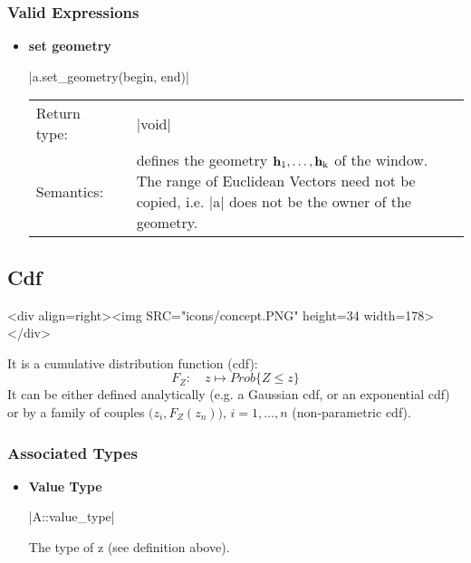 \documentclass[12pt,twoside]{report}
\newcommand{\mloc}[1]{\rm{\bf #1}}
\begin{document}
 
\htmlrule[CLEAR=all]  \subsubsection*{Valid Expressions}
\begin{itemize}

\item {\bf set geometry}

  |a.set_geometry(begin, end)|

  \begin{tabular}[!h]{l p{1cm} p{10cm}}
    Return type: & & |void|\\
    Semantics: & & defines the geometry $\mloc{h}_1,\ldots, \mloc{h}_k$ of the window. The range of Euclidean Vectors need not be copied, i.e. |a| does not be the owner of the geometry.\\
  \end{tabular}

\end{itemize}












% 
\subsection{Cdf}
\label{concept:cdf}
\begin{htmlonly}
<div align=right><img SRC="icons/concept.PNG" height=34 width=178></div>
\end{htmlonly}


It is a cumulative distribution function (cdf):
\begin{displaymath}
  F_Z:\quad z \longmapsto Prob\{Z \le z\} 
\end{displaymath}
It can be either defined analytically (e.g. a Gaussian cdf, or an exponential cdf) or by a family of couples \mbox{$\Big(z_i, F_Z(z_n) \Big)$}, \mbox{$i=1,\ldots,n$} (non-parametric cdf).




\htmlrule[CLEAR=all]  \subsubsection*{Associated Types}
\begin{itemize}
\item {\bf Value Type}

  |A::value_type|

  The type of z (see definition above).


\end{itemize}
\end{document}

